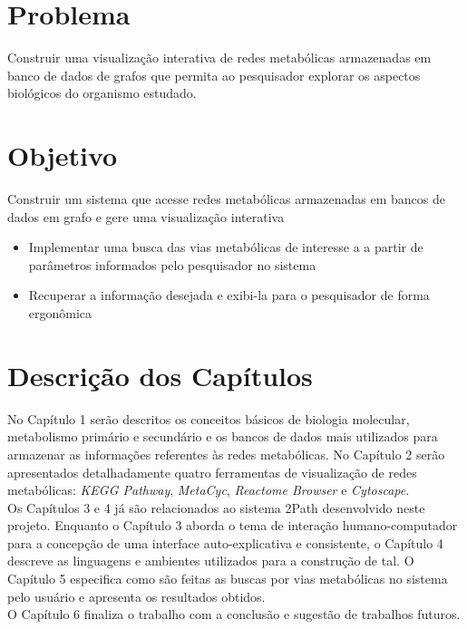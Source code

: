 \section*{Problema}
\indent Construir uma visualização interativa de redes metabólicas armazenadas em banco de dados de grafos que permita ao pesquisador explorar os aspectos biológicos do organismo estudado.

\section*{Objetivo}
\indent Construir um sistema que acesse redes metabólicas armazenadas em bancos de dados em grafo e gere uma visualização interativa
\begin{itemize}
 \item Implementar uma busca das vias metabólicas de interesse a a partir de parâmetros informados pelo pesquisador no sistema
 \item Recuperar a informação desejada e exibi-la para o pesquisador de forma ergonômica
\end{itemize}

\section*{Descrição dos Capítulos}
\indent No Capítulo 1 serão descritos os conceitos básicos de biologia molecular, metabolismo primário e secundário e os bancos de dados mais utilizados para armazenar as informações referentes às redes metabólicas. No Capítulo 2 serão apresentados detalhadamente quatro ferramentas de visualização de redes metabólicas: \textit{KEGG Pathway}, \textit{MetaCyc}, \textit{Reactome Browser} e \textit{Cytoscape}. \\ 
\indent Os Capítulos 3 e 4 já são relacionados ao sistema 2Path desenvolvido neste projeto. Enquanto o Capítulo 3 aborda o tema de interação humano-computador para a concepção de uma interface auto-explicativa e consistente, o Capítulo 4 descreve as linguagens e ambientes utilizados para a construção de tal. O Capítulo 5 especifica como são feitas as buscas por vias metabólicas no sistema pelo usuário e apresenta os resultados obtidos. \\
\indent O Capítulo 6 finaliza o trabalho com a conclusão e sugestão de trabalhos futuros.
